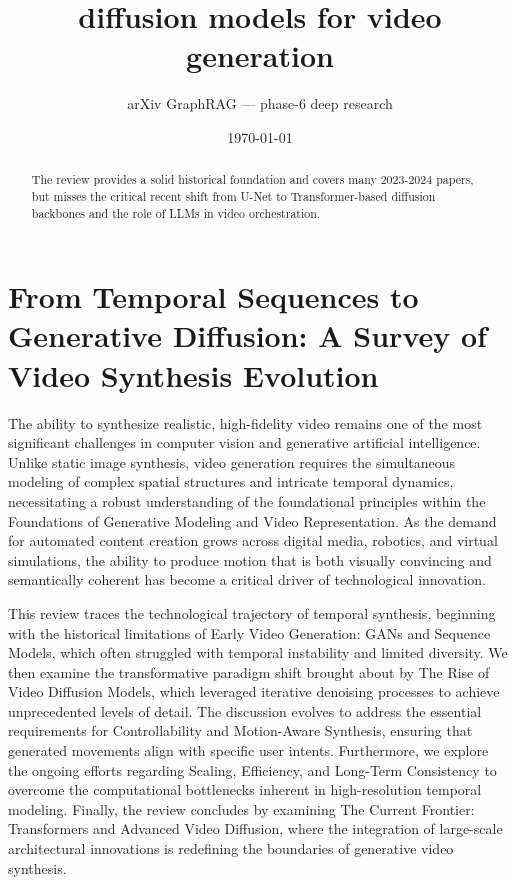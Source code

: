 \documentclass[11pt]{article}
\title{diffusion models for video generation}
\author{arXiv GraphRAG --- phase-6 deep research}
\date{\today}
\begin{document}
\maketitle

\begin{abstract}
The review provides a solid historical foundation and covers many 2023-2024 papers, but misses the critical recent shift from U-Net to Transformer-based diffusion backbones and the role of LLMs in video orchestration.
\end{abstract}

\section{From Temporal Sequences to Generative Diffusion: A Survey of Video Synthesis Evolution}

The ability to synthesize realistic, high-fidelity video remains one of the most significant challenges in computer vision and generative artificial intelligence. Unlike static image synthesis, video generation requires the simultaneous modeling of complex spatial structures and intricate temporal dynamics, necessitating a robust understanding of the foundational principles within the Foundations of Generative Modeling and Video Representation. As the demand for automated content creation grows across digital media, robotics, and virtual simulations, the ability to produce motion that is both visually convincing and semantically coherent has become a critical driver of technological innovation.

This review traces the technological trajectory of temporal synthesis, beginning with the historical limitations of Early Video Generation: GANs and Sequence Models, which often struggled with temporal instability and limited diversity. We then examine the transformative paradigm shift brought about by The Rise of Video Diffusion Models, which leveraged iterative denoising processes to achieve unprecedented levels of detail. The discussion evolves to address the essential requirements for Controllability and Motion-Aware Synthesis, ensuring that generated movements align with specific user intents. Furthermore, we explore the ongoing efforts regarding Scaling, Efficiency, and Long-Term Consistency to overcome the computational bottlenecks inherent in high-resolution temporal modeling. Finally, the review concludes by examining The Current Frontier: Transformers and Advanced Video Diffusion, where the integration of large-scale architectural innovations is redefining the boundaries of generative video synthesis.
\end{document}
